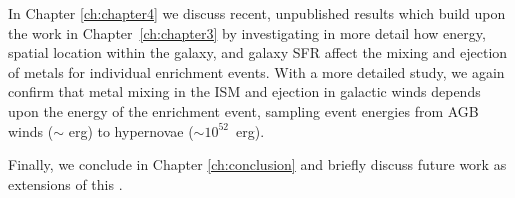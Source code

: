 In Chapter \ref{ch:chapter4} we discuss recent, unpublished results which build upon the work in Chapter~\ref{ch:chapter3} by investigating in more detail how energy, spatial location within the galaxy, and galaxy SFR affect the mixing and ejection of metals for individual enrichment events. With a more detailed study, we again confirm that metal mixing in the ISM and ejection in galactic winds depends upon the energy of the enrichment event, sampling event energies from AGB winds ($\sim$ erg) to hypernovae ($\sim 10^{52}$~erg).

Finally, we conclude in Chapter \ref{ch:conclusion} and briefly discuss future work as extensions of this \dissertation.
